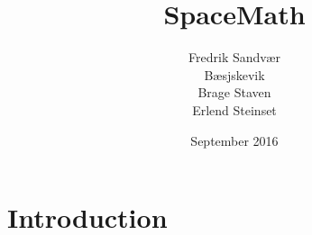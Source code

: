 \documentclass{article}
\title{SpaceMath}
\author{
  Fredrik Sandvær\\
  Bæsjskevik\\
  Brage Staven\\
  Erlend Steinset\\
}
\date{September 2016}
\begin{document}
\maketitle

\section{Introduction}
\end{document}

